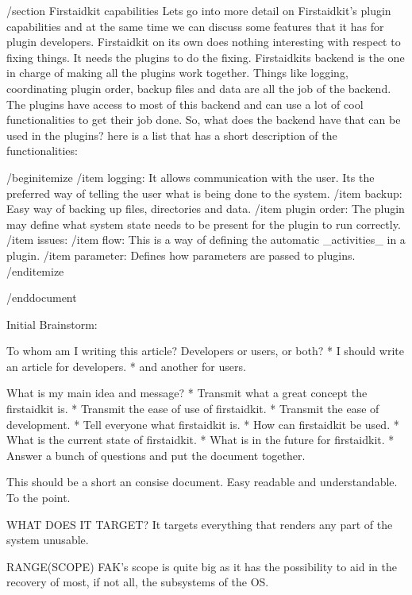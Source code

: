 /section{ Firstaidkit capabilities }
Lets go into more detail on Firstaidkit's plugin capabilities and at the same time we can discuss some features that it has for plugin developers.  Firstaidkit on its own does nothing interesting with respect to fixing things.  It needs the plugins to do the fixing.  Firstaidkits backend is the one in charge of making all the plugins work together.  Things like logging, coordinating plugin order, backup files and data are all the job of the backend.  The plugins have access to most of this backend and can use a lot of cool functionalities to get their job done.  So, what does the backend have that can be used in the plugins?  here is a list that has a short description of the functionalities:

/begin{itemize}
/item logging: It allows communication with the user.  Its the preferred way of telling the user what is being done to the system.
/item backup: Easy way of backing up files, directories and data.
/item plugin order: The plugin may define what system state needs to be present for the plugin to run correctly.
/item issues:
/item flow: This is a way of defining the automatic _activities_ in a plugin.
/item parameter: Defines how parameters are passed to plugins.
/end{itemize}

/end{document}

Initial Brainstorm:

To whom am I writing this article?  Developers or users, or both?
 * I should write an article for developers.
 * and another for users.

What is my main idea and message?
 * Transmit what a great concept the firstaidkit is.
 * Transmit the ease of use of firstaidkit.
 * Transmit the ease of development.
 * Tell everyone what firstaidkit is.
 * How can firstaidkit be used.
 * What is the current state of firstaidkit.
 * What is in the future for firstaidkit.
 * Answer a bunch of questions and put the document together.

This should be a short an consise document.  Easy readable and understandable.  To the point.



WHAT DOES IT TARGET?
It targets everything that renders any part of the system unusable.

RANGE(SCOPE)
FAK's scope is quite big as it has the possibility to aid in the recovery of most, if not all, the subsystems of the OS.
